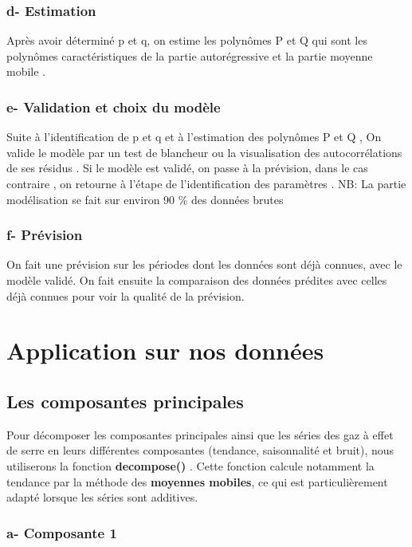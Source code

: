 \documentclass[a4paper,12pt]{report}%
\begin{document}
\subsubsection{d- Estimation}
Après avoir déterminé p et q,  on  estime les polynômes P et Q  qui sont les polynômes caractéristiques de la partie autorégressive et la partie moyenne mobile .

\subsubsection{e-  Validation et choix du modèle}

Suite à l’identification de p et q et à l’estimation des polynômes P et Q , On valide le modèle par un test de blancheur ou la visualisation des autocorrélations de ses résidus  . Si le modèle est validé, on passe à la prévision, dans le cas contraire ,  on retourne à l’étape de l’identification des paramètres . \newline
NB: La partie modélisation se fait sur environ 90 \% des données brutes

\subsubsection{f-  Prévision}
On fait une prévision sur les périodes dont les données sont déjà connues,  avec le modèle validé. 
On fait ensuite la comparaison des données prédites avec celles déjà connues pour voir la qualité de la prévision.

\section{Application sur nos données}

\subsection{Les composantes principales}
Pour décomposer les composantes principales ainsi que les séries des gaz à effet de serre en leurs différentes composantes (tendance, saisonnalité et bruit), nous utiliserons la fonction \textbf{decompose()}
. Cette fonction calcule notamment la tendance par la méthode des \textbf{moyennes mobiles}, ce qui est particulièrement adapté lorsque les séries sont additives.

\subsubsection{a- Composante 1}
\end{document}
